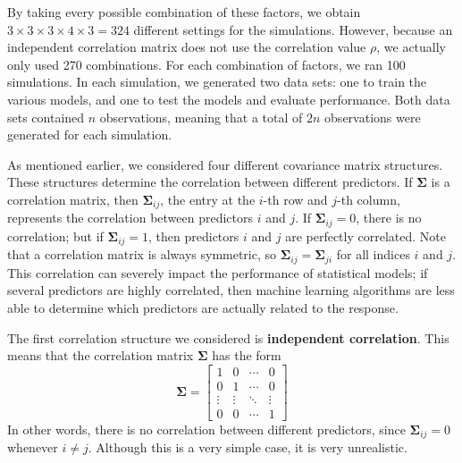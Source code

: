 \documentclass{article}
\begin{document}
By taking every possible combination of these factors, we obtain $3\times 3\times 3\times 4\times 3 = 324$ different settings for the simulations. However, because an independent correlation matrix does not use the correlation value $\rho$, we actually only used 270 combinations. For each combination of factors, we ran 100 simulations. In each simulation, we generated two data sets: one to train the various models, and one to test the models and evaluate performance. Both data sets contained $n$ observations, meaning that a total of $2n$ observations were generated for each simulation.

As mentioned earlier, we considered four different covariance matrix structures. These structures determine the correlation between different predictors. If $\mathbf{\Sigma}$ is a correlation matrix, then $\mathbf{\Sigma}_{ij}$, the entry at the $i$-th row and $j$-th column, represents the correlation between predictors $i$ and $j$. If $\mathbf{\Sigma}_{ij}=0$, there is no correlation; but if $\mathbf{\Sigma}_{ij}=1$, then predictors $i$ and $j$ are perfectly correlated. Note that a correlation matrix is always symmetric, so $\mathbf{\Sigma}_{ij} = \mathbf{\Sigma}_{ji}$ for all indices $i$ and $j$. This correlation can severely impact the performance of statistical models; if several predictors are highly correlated, then machine learning algorithms are less able to determine which predictors are actually related to the response.

The first correlation structure we considered is \textbf{independent correlation}. This means that the correlation matrix $\mathbf{\Sigma}$ has the form
\begin{equation}
	\mathbf{\Sigma} = \begin{bmatrix}
		1 & 0 & \cdots & 0 \\
		0 & 1 & \cdots & 0 \\
		\vdots & \vdots & \ddots & \vdots \\
		0 & 0 & \cdots & 1
	\end{bmatrix}
\end{equation}
In other words, there is no correlation between different predictors, since $\mathbf{\Sigma}_{ij} = 0$ whenever $i\neq j$. Although this is a very simple case, it is very unrealistic.
\end{document}
